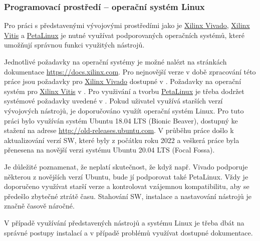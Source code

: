 \documentclass[a4paper, twoside, 11pt]{article}
\begin{document}
		\subsubsection{Programovací prostředí – operační systém Linux}
			Pro práci s představenými vývojovými prostředími jako je \hyperref[subsubsec:xilinx-vivado]{Xilinx Vivado}, \hyperref[subsubsec:xilinx-vitis]{Xilinx Vitis} a \hyperref[subsubsec:petalinux]{PetaLinux} je nutné využívat podporovaných operačních systémů, které umožňují správnou funkci využitých nástrojů.\par
			Jednotlivé požadavky na operační systémy je možné nalézt na stránkách dokumentace \href{https://docs.xilinx.com}{\textcolor{ctublue}{https://docs.xilinx.com}}. Pro nejnovější verze v době zpracování této práce jsou požadavky pro \hyperref[subsubsec:xilinx-vivado]{Xilinx Vivado} dostupné v \cite{xilinx-vivado-design-suite-user-guide-2022}. Požadavky na operační systém pro \hyperref[subsubsec:xilinx-vitis]{Xilinx Vitis} v \cite{vitis-unified-software-platform-documentation-2022}. Pro využivání a tvorbu \hyperref[subsubsec:petalinux]{PetaLinux} je třeba dodržet systémové požadavky uvedené v \cite{petalinux-tools-documentation-2022}.
			Pokud uživatel využívá starších verzí vývojových nástrojů, je doporučováno využít operační systém Linux. Pro tuto práci bylo využíván systém Ubuntu 18.04 LTS (Bionic Beaver), dostupný ke stažení na adrese \href{http://old-releases.ubuntu.com}{\textcolor{ctublue}{http://old-releases.ubuntu.com}}. V průběhu práce došlo k aktualizování verzí SW, které byly z počátku roku 2022 a veškerá práce byla přenesena na novější verzi systému Ubuntu 20.04 LTS (Focal Fossa).\par
			Je důležité poznamenat, že neplatí skutečnost, že když např. Vivado podporuje některou z novějších verzí Ubuntu, bude jí podporovat také PetaLinux. Vždy je doporučeno využívat starší verze a kontrolovat vzájemnou kompatibilitu, aby se předešlo zbytečné ztrátě času. Stahování SW, instalace a nastavování nástrojů je značně časově náročné.\par
			V případě využívání představených nástrojů a systému Linux je třeba dbát na správné postupy instalací a v případě problémů využívat dostupné dokumentace.
\end{document}
